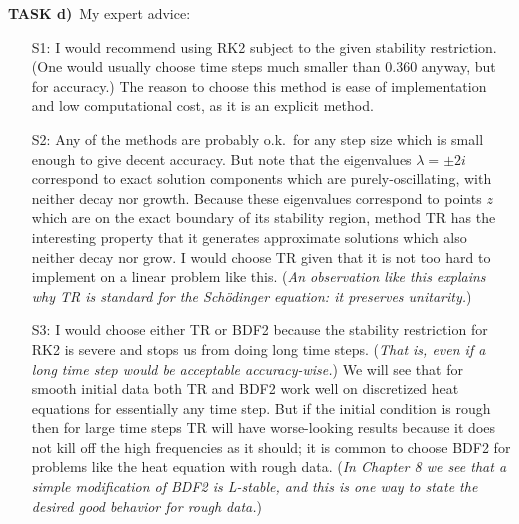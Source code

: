 \documentclass[11pt]{amsart}
\newcommand{\prob}[1]{\bigskip\noindent\textbf{#1}\, }
\begin{document}
\prob{TASK d)}  My expert advice:

\begin{itemize}
\item[S1:] I would recommend using RK2 subject to the given stability restriction.  (One would usually choose time steps much smaller than 0.360 anyway, but for accuracy.)  The reason to choose this method is ease of implementation and low computational cost, as it is an explicit method.
\item[S2:] Any of the methods are probably o.k.~for any step size which is small enough to give decent accuracy.  But note that the eigenvalues $\lambda=\pm 2 i$ correspond to exact solution components which are purely-oscillating, with neither decay nor growth.  Because these eigenvalues correspond to points $z$ which are on the exact boundary of its stability region, method TR has the interesting property that it generates approximate solutions which also neither decay nor grow.  I would choose TR given that it is not too hard to implement on a linear problem like this.  (\emph{An observation like this explains why TR is standard for the Sch\"odinger equation: it preserves unitarity.})
\item[S3:] I would choose either TR or BDF2 because the stability restriction for RK2 is severe and stops us from doing long time steps.  (\emph{That is, even if a long time step would be acceptable accuracy-wise.})  We will see that for smooth initial data both TR and BDF2 work well on discretized heat equations for essentially any time step.  But if the initial condition is rough then for large time steps TR will have worse-looking results because it does not kill off the high frequencies as it should; it is common to choose BDF2 for problems like the heat equation with rough data.  (\emph{In Chapter 8 we see that a simple modification of BDF2 is L-stable, and this is one way to state the desired good behavior for rough data.})
\end{itemize}
\end{document}
